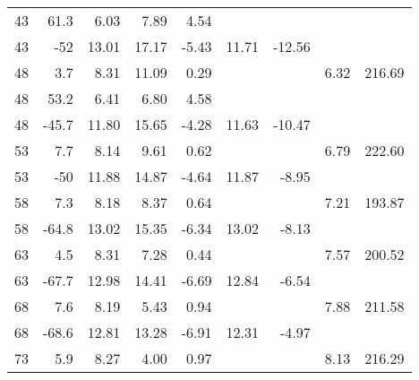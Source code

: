 \begin{table}[H]
\begin{tabular}{|r|r|r|r|r|r|r|r|r|}
            43 &       61.3 &       6.03 &       7.89 &       4.54 &            &            &            &            \\
    
            43 &        -52 &      13.01 &      17.17 &      -5.43 &      11.71 &     -12.56 &            &            \\
    \hline
            48 &        3.7 &       8.31 &      11.09 &       0.29 &            &            &       6.32 &     216.69 \\
    
            48 &       53.2 &       6.41 &       6.80 &       4.58 &            &            &            &            \\
    
            48 &      -45.7 &      11.80 &      15.65 &      -4.28 &      11.63 &     -10.47 &            &            \\
    \hline
            53 &        7.7 &       8.14 &       9.61 &       0.62 &            &            &       6.79 &     222.60 \\
    
            53 &        -50 &      11.88 &      14.87 &      -4.64 &      11.87 &      -8.95 &            &            \\
    \hline
            58 &        7.3 &       8.18 &       8.37 &       0.64 &            &            &       7.21 &     193.87 \\
    
            58 &      -64.8 &      13.02 &      15.35 &      -6.34 &      13.02 &      -8.13 &            &            \\
    \hline
            63 &        4.5 &       8.31 &       7.28 &       0.44 &            &            &       7.57 &     200.52 \\
    
            63 &      -67.7 &      12.98 &      14.41 &      -6.69 &      12.84 &      -6.54 &            &            \\
    \hline
            68 &        7.6 &       8.19 &       5.43 &       0.94 &            &            &       7.88 &     211.58 \\
    
            68 &      -68.6 &      12.81 &      13.28 &      -6.91 &      12.31 &      -4.97 &            &            \\
    \hline
            73 &        5.9 &       8.27 &       4.00 &       0.97 &            &            &       8.13 &     216.29 \\
    

\end{tabular}
\end{table}
